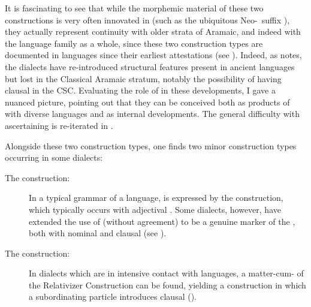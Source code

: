 It is fascinating to see that while the morphemic material of these two constructions is very often innovated in  (such as the ubiquitous Neo-\cst\ suffix \ed), they actually represent continuity with older strata of Aramaic, and indeed with the  language family as a whole, since these two construction types are documented in  languages since their  earliest attestations (see ). Indeed, as \citet{CohenNucleus} notes, the  dialects have re-introduced structural features present in ancient  languages but lost in the Classical Aramaic stratum, notably the possibility of having clausal \secns in the CSC. Evaluating the role of  in these developments, I gave a nuanced picture, pointing out that they can be conceived both as products of  with diverse languages and as internal developments. The general difficulty with ascertaining  is re-iterated in . 

Alongside these two construction types, one finds two minor construction types occurring in some  dialects:

\begin{description}

\item[The  construction:] In a typical grammar of a  language,  is expressed by the   construction, which typically occurs with adjectival \secns. Some  dialects, however, have extended the use of  (without agreement) to be a genuine marker of the , both with nominal and clausal \secns (see ). 

\item[The  construction:] In dialects which are in intensive contact with  languages, a matter-cum- of the Relativizer Construction can be found, yielding a construction in which a subordinating particle introduces clausal \secns ().

\end{description}


